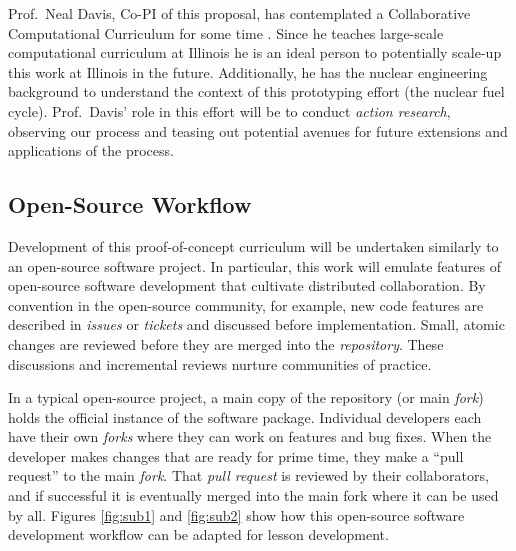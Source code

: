 \documentclass[11pt]{article}
\begin{document}
          Prof.~Neal Davis, Co-PI of this proposal, has contemplated a 
          Collaborative Computational Curriculum for some time 
          \cite{davis_university_2016}. Since he 
          teaches large-scale computational curriculum at Illinois 
          he is an ideal person to potentially scale-up this work at Illinois in the 
          future. Additionally, he has the nuclear engineering background to 
          understand the context of this prototyping effort (the nuclear fuel 
          cycle). Prof.~Davis' role 
          in this effort will be to conduct \emph{action research}, observing 
          our process and teasing out potential avenues for future 
          extensions and applications of the process. 

          \subsection{Open-Source Workflow}
          Development of this proof-of-concept curriculum will be undertaken 
          similarly to an open-source software project. 
          In particular, this work will emulate features of open-source software development 
          that cultivate distributed collaboration. By convention in the open-source community, for 
          example, new code features are described in \emph{issues} or 
          \emph{tickets} and discussed before implementation. Small, atomic 
          changes are reviewed before they are merged into the 
          \emph{repository}. These discussions and incremental reviews nurture 
          communities of practice.

          In a typical open-source project, a main copy of the 
          repository (or main \emph{fork}) holds the 
          official instance of the software package. Individual developers each have their own 
          \emph{forks} where they can work on features and 
          bug fixes. When the developer makes changes that are ready for prime 
          time, they make a ``pull request'' to the main \emph{fork}. That 
          \emph{pull request} is 
          reviewed by their collaborators, and if successful it is eventually merged into the 
          main fork where it can be used by all. Figures 
          \ref{fig:sub1} and \ref{fig:sub2} show how this open-source software 
          development workflow can be adapted for lesson development.
\end{document}

